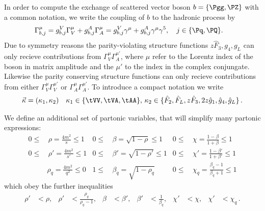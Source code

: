 In order to compute the exchange of scattered vector boson $b=\{\Pgg,\PZ\}$ with a common notation, we write the coupling of $b$ to the hadronic process by
\begin{align}
\Gamma^\mu_{b,j} &= g^V_{b,j} \Gamma^\mu_{V} + g^A_{b,j} \Gamma^\mu_{A} = g^V_{b,j} \gamma^\mu + g^A_{b,j} \gamma^\mu\gamma^5, \quad j\in\{\Pq,\PQ\}.
\end{align}
Due to symmetry reasons the parity-violating structure functions $z\hat F_3,g_4,g_L$ can only recieve contributions from $\Gamma^\mu_V\Gamma^{\mu'}_A$, where $\mu$  refer to the Lorentz index of the boson in matrix amplitude and the $\mu'$ to the index in the complex conjungate. Likewise the parity conserving structure functions can only recieve contributions from either $\Gamma^\mu_V\Gamma^{\mu'}_V$ or $\Gamma^\mu_A\Gamma^{\mu'}_A$. To introduce a compact notation we write
\begin{align}
\vec \kappa =(\kappa_1,\kappa_2)\quad\kappa_1\in\{\tVV,\tVA,\tAA\},\,\kappa_2\in\{\hat F_2,\hat F_L,z\hat F_3,2z\hat g_1,\hat g_4,\hat g_L\}\,.
\end{align}

We define an additional set of partonic variables, that will simplify many partonic expressions:
\begin{align}
0\leq&\,\rho = \frac {4m^2} s\leq 1 &0\leq&\,\beta = \sqrt{1-\rho}\leq 1 &0\leq&\,\chi = \frac{1-\beta}{1+\beta}\leq 1\\
0\leq&\,\rho' = \frac {4m^2} {s'}\leq 1 &0\leq&\,\beta' = \sqrt{1-\rho'}\leq 1 &0\leq&\,\chi' = \frac{1-\beta'}{1+\beta'}\leq 1\\
&\rho_q = \frac {4m^2} {q^2}\leq 0 &1\leq&\,\beta_q = \sqrt{1-\rho_q} &0\leq&\,\chi_q = \frac{\beta_q-1}{\beta_q+1}\leq 1
\end{align}
which obey the further inequalities
\begin{align}
\rho' &< \rho, &\rho'&<\frac{\rho_q}{\rho_q-1},
&\beta &< \beta', &\beta'&<\frac 1 {\beta_q},
&\chi' &<\chi, &\chi' &<\chi_q\,.
\end{align}
